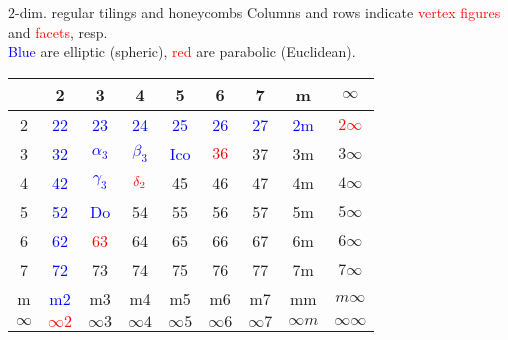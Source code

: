 \documentclass[%
pdf,
colorBG,
slideColor,
]{prosper}
\begin{document}
\begin{slide}{$2$-dim. regular tilings and honeycombs}
\vspace{-3mm}
Columns and rows indicate \textcolor{red}{vertex figures}
and \textcolor{red}{facets}, resp.\\
\textcolor{blue}{Blue} are elliptic (spheric),
\textcolor{red}{red} are parabolic (Euclidean). 

\begin{center}
\begin{tabular}{|c||c|c|c|c|c|c|c|c||} \hline
 &2&3 &4 & 5 &6 &7 &m & $\infty$ \\ \hline \hline
2&\textcolor{blue}{22}&\textcolor{blue}{23}&\textcolor{blue}{24}&\textcolor{blue}{25}&\textcolor{blue}{26}&\textcolor{blue}{27}&\textcolor{blue}{2m}&\textcolor{red}{$2 \infty$} \\ \hline
3&\textcolor{blue}{32}&\textcolor{blue}{$\alpha_3$}&\textcolor{blue}{$\beta_3$}&\textcolor{blue}{Ico}&\textcolor{red}{$36$}&37&3m&$3 \infty$ \\
 \hline  
4&\textcolor{blue}{42}&\textcolor{blue}{$\gamma_3$}&$\textcolor{red}{\delta_2}$ &45&46&47&4m&$4 \infty$ \\ \hline
5&\textcolor{blue}{52}&\textcolor{blue}{Do}&54&55&56&57&5m&$5 \infty$ \\ \hline
6&\textcolor{blue}{62}&\textcolor{red}{63}&64&65&66&67&6m&$6 \infty$  \\ \hline
7&\textcolor{blue}{72}&73&74&75&76&77&7m&$7 \infty$ \\ \hline
m&\textcolor{blue}{m2}&m3&m4&m5&m6&m7&mm&$m \infty$\\ \hline
 $\infty$ & \textcolor{red}{$\infty 2$}& $\infty 3$& $\infty 4$& $\infty 5$& $\infty 6$& $\infty 7$&$\infty m$& $\infty \infty$ \\ \hline \hline
\end{tabular}
\end{center}

\end{slide}
\end{document}
